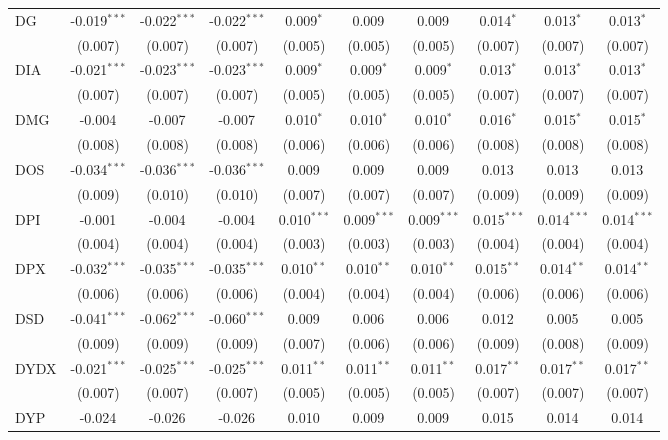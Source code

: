 \begin{table}[!htbp]
\begin{tabular}{@{\extracolsep{5pt}}lccccccccc}
 DG & -0.019$^{***}$ & -0.022$^{***}$ & -0.022$^{***}$ & 0.009$^{*}$ & 0.009$^{}$ & 0.009$^{}$ & 0.014$^{*}$ & 0.013$^{*}$ & 0.013$^{*}$ \\
  & (0.007) & (0.007) & (0.007) & (0.005) & (0.005) & (0.005) & (0.007) & (0.007) & (0.007) \\
 DIA & -0.021$^{***}$ & -0.023$^{***}$ & -0.023$^{***}$ & 0.009$^{*}$ & 0.009$^{*}$ & 0.009$^{*}$ & 0.013$^{*}$ & 0.013$^{*}$ & 0.013$^{*}$ \\
  & (0.007) & (0.007) & (0.007) & (0.005) & (0.005) & (0.005) & (0.007) & (0.007) & (0.007) \\
 DMG & -0.004$^{}$ & -0.007$^{}$ & -0.007$^{}$ & 0.010$^{*}$ & 0.010$^{*}$ & 0.010$^{*}$ & 0.016$^{*}$ & 0.015$^{*}$ & 0.015$^{*}$ \\
  & (0.008) & (0.008) & (0.008) & (0.006) & (0.006) & (0.006) & (0.008) & (0.008) & (0.008) \\
 DOS & -0.034$^{***}$ & -0.036$^{***}$ & -0.036$^{***}$ & 0.009$^{}$ & 0.009$^{}$ & 0.009$^{}$ & 0.013$^{}$ & 0.013$^{}$ & 0.013$^{}$ \\
  & (0.009) & (0.010) & (0.010) & (0.007) & (0.007) & (0.007) & (0.009) & (0.009) & (0.009) \\
 DPI & -0.001$^{}$ & -0.004$^{}$ & -0.004$^{}$ & 0.010$^{***}$ & 0.009$^{***}$ & 0.009$^{***}$ & 0.015$^{***}$ & 0.014$^{***}$ & 0.014$^{***}$ \\
  & (0.004) & (0.004) & (0.004) & (0.003) & (0.003) & (0.003) & (0.004) & (0.004) & (0.004) \\
 DPX & -0.032$^{***}$ & -0.035$^{***}$ & -0.035$^{***}$ & 0.010$^{**}$ & 0.010$^{**}$ & 0.010$^{**}$ & 0.015$^{**}$ & 0.014$^{**}$ & 0.014$^{**}$ \\
  & (0.006) & (0.006) & (0.006) & (0.004) & (0.004) & (0.004) & (0.006) & (0.006) & (0.006) \\
 DSD & -0.041$^{***}$ & -0.062$^{***}$ & -0.060$^{***}$ & 0.009$^{}$ & 0.006$^{}$ & 0.006$^{}$ & 0.012$^{}$ & 0.005$^{}$ & 0.005$^{}$ \\
  & (0.009) & (0.009) & (0.009) & (0.007) & (0.006) & (0.006) & (0.009) & (0.008) & (0.009) \\
 DYDX & -0.021$^{***}$ & -0.025$^{***}$ & -0.025$^{***}$ & 0.011$^{**}$ & 0.011$^{**}$ & 0.011$^{**}$ & 0.017$^{**}$ & 0.017$^{**}$ & 0.017$^{**}$ \\
  & (0.007) & (0.007) & (0.007) & (0.005) & (0.005) & (0.005) & (0.007) & (0.007) & (0.007) \\
 DYP & -0.024$^{}$ & -0.026$^{}$ & -0.026$^{}$ & 0.010$^{}$ & 0.009$^{}$ & 0.009$^{}$ & 0.015$^{}$ & 0.014$^{}$ & 0.014$^{}$ \\

\end{tabular}
\end{table}
